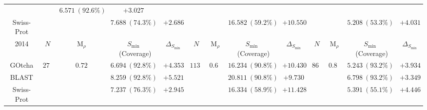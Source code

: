 \begin{tabular}{c|cccc|cccc|cccc}
& & $6.571~(92.6\%)$ & $+3.027$ \\
Swiss-Prot &
& & $7.688~(74.3\%)$ & $+2.686$ &
& & $16.582~(59.2\%)$ & $+10.550$ &
& & $5.208~(53.3\%)$ & $+4.031$ \\
\hline
2014 &
$N$ & $\mathrm{M}_{\rho}$ & $S_{\min}$~(Coverage) & $\Delta_{S_{\min}}$ &
$N$ & $\mathrm{M}_{\rho}$ & $S_{\min}$~(Coverage) & $\Delta_{S_{\min}}$ &
$N$ & $\mathrm{M}_{\rho}$ & $S_{\min}$~(Coverage) & $\Delta_{S_{\min}}$ \\ \hline 
GOtcha & 
\multirow{3}{*}{$279$} & \multirow{3}{*}{$0.72$} & $6.694~(92.8\%)$ & $+4.353$ &
\multirow{3}{*}{$1130$} & \multirow{3}{*}{$0.67$} & $16.234~(90.8\%)$ & $+10.430$ &
\multirow{3}{*}{$865$} & \multirow{3}{*}{$0.85$} & $5.243~(93.2\%)$ & $+3.934$ \\
BLAST &
& & $8.259~(92.8\%)$ & $+5.521$ &
& & $20.811~(90.8\%)$ & $+9.730$ &
& & $6.798~(93.2\%)$ & $+3.349$ \\
Swiss-Prot &
& & $7.237~(76.3\%)$ & $+2.945$ &
& & $16.334~(58.9\%)$ & $+11.428$ &
& & $5.391~(55.1\%)$ & $+4.446$ \\
\hline
\end{tabular}
